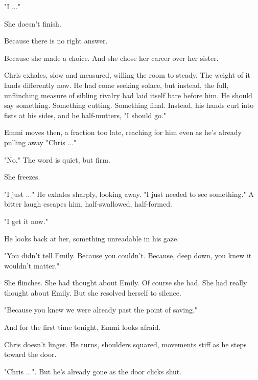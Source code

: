 "I ..."

\smallskip

She doesn’t finish.  

\smallskip

Because there is no right answer.  

\smallskip

Because she made a choice. And she chose her career over her sister.  

\smallskip

Chris exhales, slow and measured, willing the room to steady. The weight of it lands differently now. He had come seeking solace, but instead, the full, unflinching measure of sibling rivalry had laid itself bare before him. He should say something. Something cutting. Something final. Instead, his hands curl into fists at his sides, and he half-mutters,  "I should go."

\smallskip  

Emmi moves then, a fraction too late, reaching for him even as he’s already pulling away "Chris ..."

"No." The word is quiet, but firm.  

She freezes.  

\smallskip  

"I just ..." He exhales sharply, looking away. "I just needed to see something." A bitter laugh escapes him, half-swallowed, half-formed.  
\smallskip  

"I get it now."

\smallskip  

He looks back at her, something unreadable in his gaze.  

\smallskip  

"You didn’t tell Emily. Because you couldn’t. Because, deep down, you knew it wouldn’t matter."

\smallskip  

She flinches.  She had thought about Emily. Of course she had. She had really thought about Emily. But she resolved herself to silence.

\smallskip  

"Because you knew we were already past the point of saving."  

\smallskip  

And for the first time tonight, Emmi looks afraid.  

\smallskip  

Chris doesn’t linger. He turns, shoulders squared, movements stiff as he steps toward the door.  

\smallskip  

"Chris ...". But he’s already gone as the door clicks shut. 

\newpage
